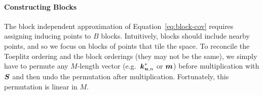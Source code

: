 \paragraph{Constructing Blocks}
The block independent approximation of Equation~\ref{eq:block-cov}
requires assigning inducing points to $B$
blocks.  Intuitively, blocks should include nearby points, and so we focus on
blocks of points that tile the space.
To reconcile the Toeplitz ordering and the block orderings (they may not be the same),
we simply have to permute any $M$-length vector
(e.g.~$\boldsymbol{k}^*_{\boldsymbol{u},n}$ or $\boldsymbol{m}$) before multiplication with $\boldsymbol{S}$ and then undo
the permutation after multiplication.  Fortunately, this permutation is linear
in $M$.

